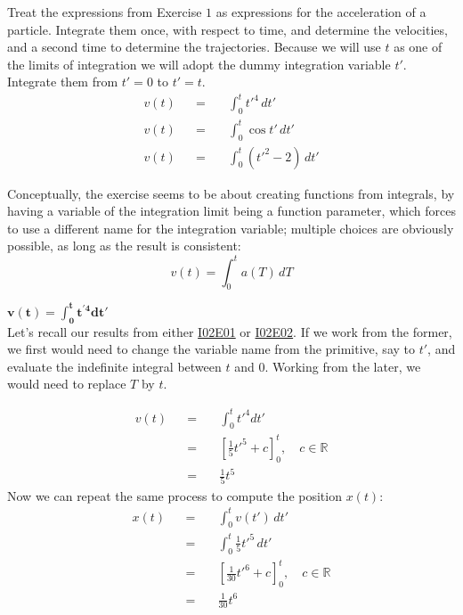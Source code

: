 \documentclass[solutions.tex]{subfiles}
\begin{document}
\maketitle
\begin{exercise} Treat the expressions from Exercise $1$
as expressions for the acceleration of a particle. Integrate
them once, with respect to time, and determine the velocities,
and a second time to determine the trajectories. Because we
will use $t$ as one of the limits of integration we will
adopt the dummy integration variable $t'$. Integrate them
from $t'=0$ to $t'=t$.
\begin{equation*} \begin{aligned}
	v(t) &&=\quad& \int_0^t t'^4\,dt' \\
	v(t) &&=\quad& \int_0^t \cos t'\,dt' \\
	v(t) &&=\quad& \int_0^t (t'^2-2)\,dt'
\end{aligned} \end{equation*}
\end{exercise}

Conceptually, the exercise seems to be about creating functions
from integrals, by having a variable of the integration limit
being a function parameter, which forces to use a different name
for the integration variable; multiple choices are obviously
possible, as long as the result is consistent:
\[
	v(t) = \int_0^t a(T)\,dT
\]

\hr
$\bm{v(t) = \int_0^t t^{'4} dt'}$\\
Let's recall our results from either
\href{https://github.com/mbivert/ttm/blob/master/cm/I02E01.pdf}{I02E01}
or
\href{https://github.com/mbivert/ttm/blob/master/cm/I02E02.pdf}{I02E02}.
If we work from the former, we first would need to change the variable
name from the primitive, say to $t'$, and evaluate the indefinite integral
between $t$ and $0$. Working from the later, we would need to replace
$T$ by $t$.

\begin{equation*} \begin{aligned}
	v(t) &&=\quad& \int_0^t t'^4 dt' \\
	~ &&=\quad& \left[\frac15t'^5 + c\right]_0^t,\quad c\in\mathbb{R} \\
	~ &&=\quad& \boxed{\frac15t^5}
\end{aligned} \end{equation*}
Now we can repeat the same process to compute the position $x(t)$:
\begin{equation*} \begin{aligned}
	x(t) &&=\quad& \int_0^t v(t')\,dt' \\
	~ &&=\quad& \int_0^t\frac15t'^5\,dt' \\
	~ &&=\quad& \left[\frac1{30}t'^6+c\right]_0^t,\quad c\in\mathbb{R} \\
	~ &&=\quad& \boxed{\frac1{30}t^6}
\end{aligned} \end{equation*}
\end{document}
